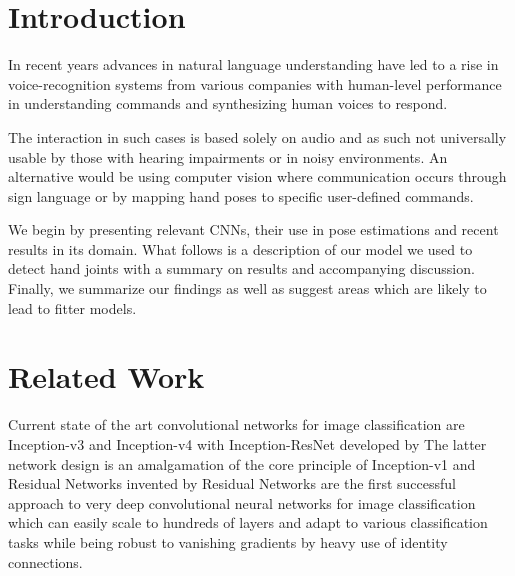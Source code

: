 \section{Introduction}
In recent years advances in natural language understanding have led to a rise in voice-recognition systems from various companies with human-level performance in understanding commands and synthesizing human voices to respond.

The interaction in such cases is based solely on audio and as such not universally usable by those with hearing impairments or in noisy environments. An alternative would be using computer vision where communication occurs through sign language or by mapping hand poses to specific user-defined commands.

We begin by presenting relevant CNNs, their use in pose estimations and recent results in its domain. What follows is a description of our model we used to detect hand joints with a summary on results and accompanying discussion. Finally, we summarize our findings as well as suggest areas which are likely to lead to fitter models.

\section{Related Work}
Current state of the art convolutional networks for image classification are Inception-v3 \cite{DBLP:journals/corr/SzegedyVISW15} and Inception-v4 with Inception-ResNet \cite{DBLP:journals/corr/SzegedyIV16} developed by \citeauthor{DBLP:journals/corr/SzegedyIV16} The latter network design is an amalgamation of the core principle of Inception-v1 and Residual Networks \cite{DBLP:journals/corr/HeZRS15} invented by \citeauthor{DBLP:journals/corr/HeZRS15} Residual Networks are the first successful approach to very deep convolutional neural networks for image classification which can easily scale to hundreds of layers and adapt to various classification tasks while being robust to vanishing gradients by heavy use of identity connections.

